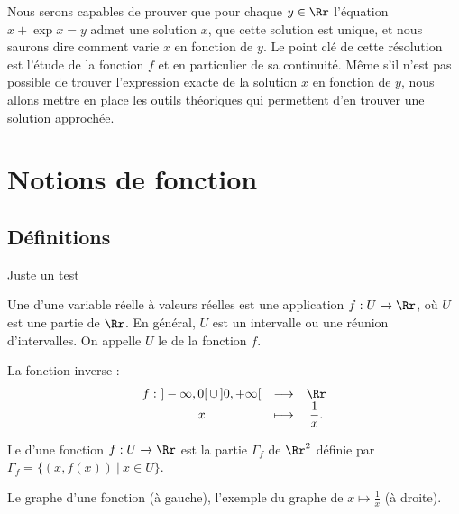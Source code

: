 \documentclass[class=report,crop=false]{standalone}
\begin{document}


Nous serons capables de prouver que pour chaque $y \in \Rr$
l'équation \og $x+\exp x = y$ \fg{} admet une solution $x$, que cette solution est unique,
et nous saurons dire comment varie $x$ en fonction de $y$.
Le point clé 
de cette résolution est l'étude de la fonction $f$ et en particulier de sa continuité.
Même s'il n'est pas possible de trouver l'expression exacte de la solution $x$ en fonction de $y$, nous allons mettre en place les outils théoriques qui permettent d'en trouver une solution approchée.



\section{Notions de fonction}

\subsection{Définitions}

Juste un test

\begin{definition}
Une  d'une variable réelle à valeurs réelles est une application
$f:U\to \Rr$, où $U$ est une partie de $\Rr$. En général, $U$ est un intervalle
ou une réunion d'intervalles. On appelle $U$ le  de
la fonction $f$.
\end{definition}

\begin{exemple}
La fonction inverse :
\[
\begin{array}{ccc}
f: \ ]-\infty,0[ \,\cup \, ]0,+\infty[ &\longrightarrow& \Rr \\
 x &\longmapsto& \dfrac1x.
 \end{array}
\]
\end{exemple}

Le  d'une fonction $f:U\to \Rr$ est la partie $\Gamma_f$
de $\Rr^2$ définie par $\Gamma_f=\big\{(x,f(x)) \ \vert \ x\in U\big\}$.


Le graphe d'une fonction (à gauche), l'exemple du graphe de $x \mapsto \frac1x$ (à droite).
\end{document}
